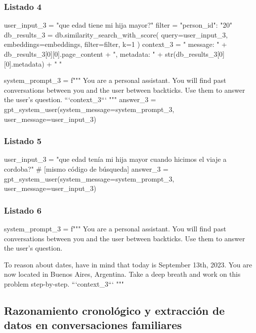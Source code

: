 \subsubsection{Listado 4}
\label{anexo:code-4-1-10-4}

\begin{APACode}
user_input_3 = "que edad tiene mi hija mayor?"
filter = {"person_id": "20"}
db_results_3 = db.similarity_search_with_score(
    query=user_input_3, 
    embeddings=embeddings, 
    filter=filter, 
    k=1
)
context_3 = "{ message: " + db_results_3[0][0].page_content + ", metadata: " + str(db_results_3[0][0].metadata) + " }"

system_prompt_3 = f"""
You are a personal assistant. You will find past conversations between you and the user between backticks. 
Use them to answer the user's question.
```{context_3}```
"""
answer_3 = gpt_system_user(system_message=system_prompt_3, user_message=user_input_3)
\end{APACode}

\subsubsection{Listado 5}
\label{anexo:code-4-1-10-5}

\begin{APACode}
user_input_3 = "que edad tenía mi hija mayor cuando hicimos el viaje a cordoba?"
# [mismo código de búsqueda]
answer_3 = gpt_system_user(system_message=system_prompt_3, user_message=user_input_3)
\end{APACode}

\subsubsection{Listado 6}
\label{anexo:code-4-1-10-6}

\begin{APACode}
system_prompt_3 = f"""
You are a personal assistant.
You will find past conversations between you and the user between backticks. 
Use them to answer the user's question.

To reason about dates, have in mind that today is September 13th, 2023. 
You are now located in Buenos Aires, Argentina.
Take a deep breath and work on this problem step-by-step.
```{context_3}```
"""
\end{APACode}

\subsection{Razonamiento cronológico y extracción de datos en conversaciones familiares}

